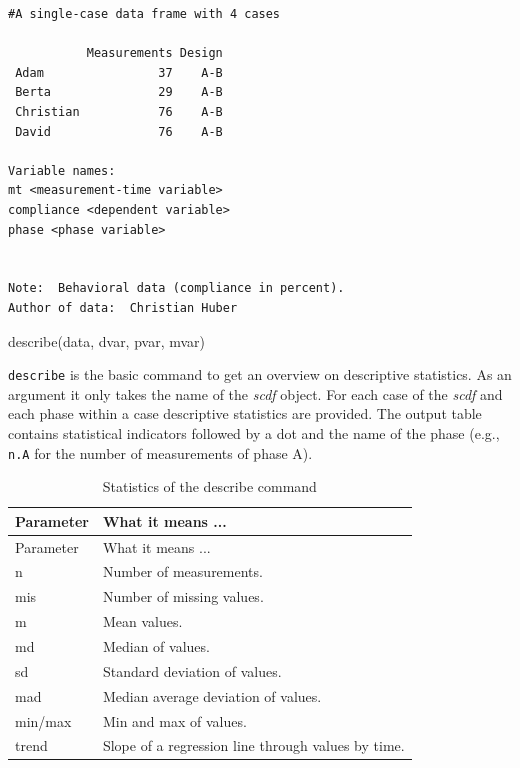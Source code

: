 \documentclass[
  letterpaper,
  DIV=11,
  numbers=noendperiod]{scrreprt}
\begin{document}
\begin{verbatim}
#A single-case data frame with 4 cases

           Measurements Design
 Adam                37    A-B
 Berta               29    A-B
 Christian           76    A-B
 David               76    A-B

Variable names:
mt <measurement-time variable>
compliance <dependent variable>
phase <phase variable>


Note:  Behavioral data (compliance in percent).
Author of data:  Christian Huber 
\end{verbatim}

\begin{tcolorbox}[enhanced jigsaw, toprule=.15mm, colframe=quarto-callout-tip-color-frame, left=2mm, colback=white, breakable, bottomrule=.15mm, arc=.35mm, rightrule=.15mm, leftrule=.75mm, opacityback=0]
\begin{minipage}[t]{5.5mm}
\textcolor{quarto-callout-tip-color}{\faLightbulb}
\end{minipage}%
\begin{minipage}[t]{\textwidth - 5.5mm}
describe(data, dvar, pvar, mvar)\end{minipage}%
\end{tcolorbox}

\texttt{describe} is the basic command to get an overview on descriptive
statistics. As an argument it only takes the name of the \emph{scdf}
object. For each case of the \emph{scdf} and each phase within a case
descriptive statistics are provided. The output table contains
statistical indicators followed by a dot and the name of the phase
(e.g., \texttt{n.A} for the number of measurements of phase A).

\begin{longtable}[]{@{}ll@{}}
\caption{Statistics of the describe command }\tabularnewline
\toprule()
Parameter & What it means ... \\
\midrule()
\endfirsthead
\toprule()
Parameter & What it means ... \\
\midrule()
\endhead
n & Number of measurements. \\
mis & Number of missing values. \\
m & Mean values. \\
md & Median of values. \\
sd & Standard deviation of values. \\
mad & Median average deviation of values. \\
min/max & Min and max of values. \\
trend & Slope of a regression line through values by time. \\
\bottomrule()
\end{longtable}
\end{document}
